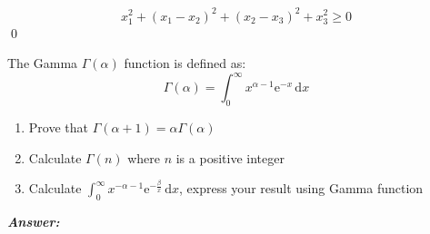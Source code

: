 \documentclass[12pt]{article}
\newenvironment{question}[2][Question]{\begin{trivlist}
\item[\hskip \labelsep {\bfseries #1}\hskip \labelsep {\bfseries #2.}]}{\end{trivlist}}
\begin{document}
\begin{equation*}
x_1^2 + (x_1 - x_2)^2 + (x_2 - x_3)^2 + x_3^2\geq 0
\end{equation*}
\qed
\bigskip
\bigskip
\begin{question}{1. 5} 
The Gamma $\Gamma(\alpha)$ function is defined as:
\begin{equation*}
\Gamma(\alpha) = \int_0^\infty x^{\alpha - 1}\mathrm{e}^{-x}\,\mathrm{d}x
\end{equation*}
\begin{enumerate}
  \item Prove that $\Gamma(\alpha + 1) = \alpha\Gamma(\alpha)$
  \item Calculate $\Gamma(n)$ where $n$ is a positive integer
  \item Calculate $\int_0^\infty x^{-\alpha - 1}\mathrm{e}^{-\frac{\beta}{x}}\,\mathrm{d}x$, express your result using Gamma function
\end{enumerate}
\end{question}


\textbf{\emph{Answer:} }
\end{document}
